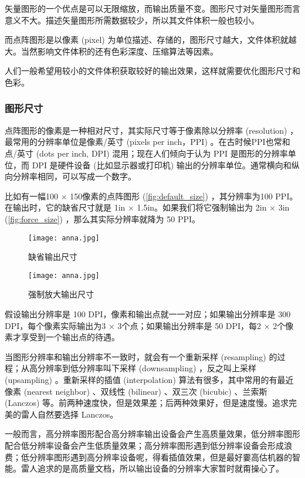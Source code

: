 矢量图形的一个优点是可以无限缩放，而输出质量不变。图形尺寸对矢量图形而言意义不大。描述矢量图形所需数据较少，所以其文件体积一般也较小。

而点阵图形是以像素 (pixel) 为单位描述、存储的，图形尺寸越大，文件体积就越大。当然影响文件体积的还有色彩深度、压缩算法等因素。

人们一般希望用较小的文件体积获取较好的输出效果，这样就需要优化图形尺寸和色彩。

\subsubsection{图形尺寸}

点阵图形的像素是一种相对尺寸，其实际尺寸等于像素除以分辨率 (resolution) ，最常用的分辨率单位是像素/英寸 (pixels per inch，PPI) 。在古时候PPI也常和点/英寸 (dots per inch, DPI) 混用；现在人们倾向于认为 PPI 是图形的分辨率单位，而 DPI 是硬件设备 (比如显示器或打印机) 输出的分辨率单位。通常横向和纵向分辨率相同，可以写成一个数字。

比如有一幅100 × 150像素的点阵图形 (\autoref{fig:default_size}) ，其分辨率为100 PPI。在输出时，它的缺省尺寸就是 1in × 1.5in。如果我们将它强制输出为 2in × 3in (\autoref{fig:force_size}) ，那么其实际分辨率就降为 50 PPI。

\begin{figure}[htbp]
\centering
\begin{minipage}[b]{1.4in}
\centering
\texttt{[image: anna.jpg]}
\caption{缺省输出尺寸}
\label{fig:default_size}
\end{minipage}
\hspace{10pt}
\begin{minipage}[b]{2in}
\centering
\texttt{[image: anna.jpg]}
\caption{强制放大输出尺寸}
\label{fig:force_size}
\end{minipage}
\end{figure}

假设输出分辨率是 100 DPI，像素和输出点就一一对应；如果输出分辨率是 300 DPI，每个像素实际输出为3 × 3个点；如果输出分辨率是 50 DPI，每2 × 2个像素才享受到一个输出点的待遇。

当图形分辨率和输出分辨率不一致时，就会有一个重新采样 (resampling) 的过程；从高分辨率到低分辨率叫下采样 (downsampling) ，反之叫上采样 (upsampling) 。重新采样的插值 (interpolation) 算法有很多，其中常用的有最近像素 (nearest neighbor) 、双线性 (bilinear) 、双三次 (bicubic) 、兰索斯 (Lanczos) 等。前两种速度快，但是效果差；后两种效果好，但是速度慢。追求完美的雷人自然要选择 Lanczos。

一般而言，高分辨率图形配合高分辨率输出设备会产生高质量效果，低分辨率图形配合低分辨率设备会产生低质量效果；高分辨率图形遇到低分辨率设备会形成浪费；低分辨率图形遇到高分辨率设备呢，得看插值效果，但是最好嫑高估机器的智能。雷人追求的是高质量文档，所以输出设备的分辨率大家暂时就甭操心了。

